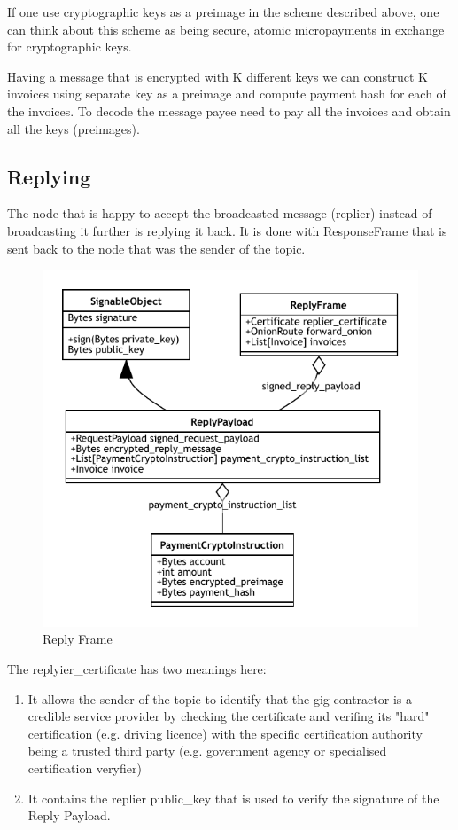 \documentclass{article}
\begin{document}
If one use cryptographic keys as a preimage in the scheme described above, one can think about this scheme as being secure, atomic micropayments in exchange for cryptographic keys.

Having a message that is encrypted with K different keys we can construct K invoices using separate key as a preimage and compute payment hash for each of the invoices. To decode the message payee need to pay all the invoices and obtain all the keys (preimages).

\subsection{Replying}
The node that is happy to accept the broadcasted message (replier) instead of broadcasting it further is replying it back. It is done with ResponseFrame that is sent back to the node that was the sender of the topic.


\begin{figure}
	\centering
	\includegraphics[scale=0.5]{ReplyFrame.pdf}
	\caption{Reply Frame}
	\label{fig:fr:replyframe}
\end{figure}

The replyier\_certificate has two meanings here:

\begin{enumerate}
	\item It allows the sender of the topic to identify that the gig contractor is a credible service provider by checking the certificate and verifing its "hard" certification (e.g. driving licence) with the specific certification authority being a trusted third party (e.g. government agency or specialised certification veryfier)
	\item It contains the replier public\_key that is used to verify the signature of the Reply Payload.
\end{enumerate}
\end{document}
